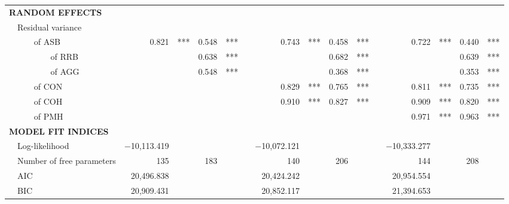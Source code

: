 {\begin{tabular}{llll r@{\hskip -0.1mm}l r@{\hskip -0.1mm}l c r@{\hskip -0.1mm}l r@{\hskip -0.1mm}l c r@{\hskip -0.1mm}l r@{\hskip -0.1mm}l}
      \multicolumn{4}{l}{\textbf{RANDOM EFFECTS}} &       &       &       &       &       &       &       &       &       &       &       &       &       &  \\
            & \multicolumn{3}{l}{Residual variance} &       &       &       &       &       &       &       &       &       &       &       &       &       &  \\
            &       & \multicolumn{2}{l}{of ASB} & 0.821 & *** & 0.548 & *** &       & 0.743 & *** & 0.458 & *** &       & 0.722 & *** & 0.440 & *** \\
            &       &       & of RRB &       &       & 0.638 & *** &       &       &       & 0.682 & *** &       &       &       & 0.639 & *** \\
            &       &       & of AGG &       &       & 0.548 & *** &       &       &       & 0.368 & *** &       &       &       & 0.353 & *** \\
            &       & \multicolumn{2}{l}{of CON} &       &       &       &       &       & 0.829 & *** & 0.765 & *** &       & 0.811 & *** & 0.735 & *** \\
            &       & \multicolumn{2}{l}{of COH} &       &       &       &       &       & 0.910 & *** & 0.827 & *** &       & 0.909 & *** & 0.820 & *** \\
            &       & \multicolumn{2}{l}{of PMH} &       &       &       &       &       &       &       &       &       &       & 0.971 & *** & 0.963 & *** \\
      \midrule
      \multicolumn{4}{l}{\textbf{MODEL FIT INDICES}} &       &       &       &       &       &       &       &       &       &       &       &       &       &  \\
            & \multicolumn{3}{l}{Log-likelihood} & $-$10,113.419 &       &       &       &       & $-$10,072.121 &       &       &       &       & $-$10,333.277 &       &       &  \\
            & \multicolumn{3}{l}{Number of free parameters} & 135   &       & 183   &       &       & 140   &       & 206   &       &       & 144   &       & 208   &  \\
            & \multicolumn{3}{l}{AIC} & 20,496.838 &       &       &       &       & 20,424.242 &       &       &       &       & 20,954.554 &       &       &  \\
            & \multicolumn{3}{l}{BIC} & 20,909.431 &       &       &       &       & 20,852.117 &       &       &       &       & 21,394.653 &       &       &  \\

\end{tabular}}
